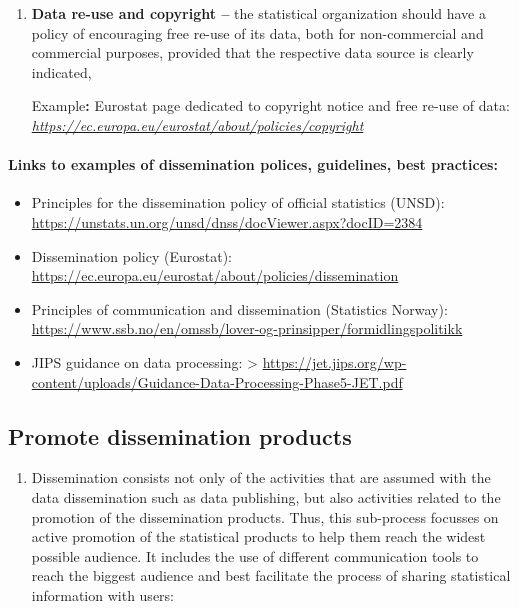 \documentclass[
]{article}
\providecommand{\tightlist}{%
  \setlength{\itemsep}{0pt}\setlength{\parskip}{0pt}}
\begin{document}
\begin{enumerate}
\def\labelenumi{\arabic{enumi}.}
\setcounter{enumi}{25}
\item
  \textbf{Data re-use and copyright --} the statistical organization should
  have a policy of encouraging free re-use of its data, both for
  non-commercial and commercial purposes, provided that the respective
  data source is clearly indicated,

  Example\textbf{:} Eurostat page dedicated to copyright notice and free
  re-use of data:
  \href{https://ec.europa.eu/eurostat/about/policies/copyright}{\emph{https://ec.europa.eu/eurostat/about/policies/copyright}}
\end{enumerate}

\hypertarget{links-to-examples-of-dissemination-polices-guidelines-best-practices}{%
\paragraph{Links to examples of dissemination polices, guidelines, best practices:}\label{links-to-examples-of-dissemination-polices-guidelines-best-practices}}

\begin{itemize}
\item
  Principles for the dissemination policy of official statistics
  (UNSD): \url{https://unstats.un.org/unsd/dnss/docViewer.aspx?docID=2384}
\item
  Dissemination policy (Eurostat):
  \url{https://ec.europa.eu/eurostat/about/policies/dissemination}
\item
  Principles of communication and dissemination (Statistics Norway):
  \url{https://www.ssb.no/en/omssb/lover-og-prinsipper/formidlingspolitikk}
\end{itemize}

\begin{itemize}
\tightlist
\item
  JIPS guidance on data processing: {}
  \textgreater{} \url{https://jet.jips.org/wp-content/uploads/Guidance-Data-Processing-Phase5-JET.pdf}
\end{itemize}

\hypertarget{promote-dissemination-products}{%
\subsection{Promote dissemination products}\label{promote-dissemination-products}}

\begin{enumerate}
\def\labelenumi{\arabic{enumi}.}
\setcounter{enumi}{524}
\tightlist
\item
  Dissemination consists not only of the activities that are assumed
  with the data dissemination such as data publishing, but also
  activities related to the promotion of the dissemination products.
  Thus, this sub-process focusses on active promotion of the
  statistical products to help them reach the widest possible
  audience. It includes the use of different communication tools to
  reach the biggest audience and best facilitate the process of
  sharing statistical information with users:
\end{enumerate}
\end{document}
